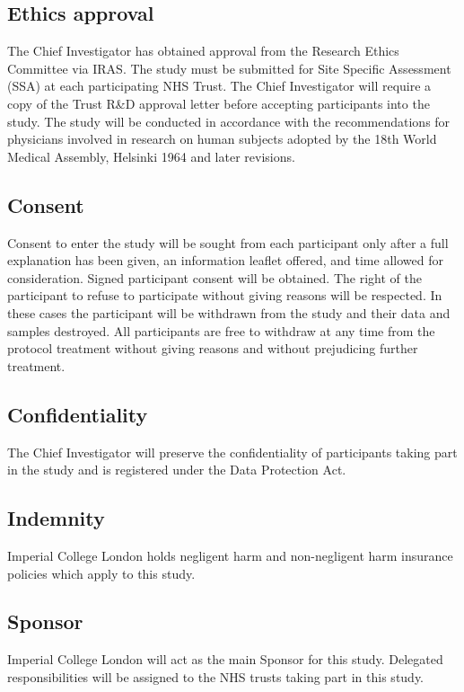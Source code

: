 \documentclass[a4paper,10pt]{article}
\begin{document}
\begin{enumerate}
\subsection{Ethics approval}
The Chief Investigator has obtained approval from the Research Ethics Committee via IRAS\@. The study must be submitted for Site Specific Assessment (SSA) at each participating NHS Trust. The Chief Investigator will require a copy of the Trust R\&D approval letter before accepting participants into the study. The study will be conducted in accordance with the recommendations for physicians involved in research on human subjects adopted by the 18th World Medical Assembly, Helsinki 1964 and later revisions.


\subsection{Consent}
Consent to enter the study will be sought from each participant only after a full explanation has been given, an information leaflet offered, and time allowed for consideration. Signed participant consent will be obtained. The right of the participant to refuse to participate without giving reasons will be respected. In these cases the participant will be withdrawn from the study and their data and samples destroyed. All participants are free to withdraw at any time from the protocol treatment without giving reasons and without prejudicing further treatment.

\subsection{Confidentiality}
The Chief Investigator will preserve the confidentiality of participants taking part in the study and is registered under the Data Protection Act.

\subsection{Indemnity}
Imperial College London holds negligent harm and non-negligent harm insurance policies which apply to this study.

\subsection{Sponsor}
Imperial College London will act as the main Sponsor for this study. Delegated responsibilities will be assigned to the NHS trusts taking part in this study.  



\end{enumerate}
\end{document}
